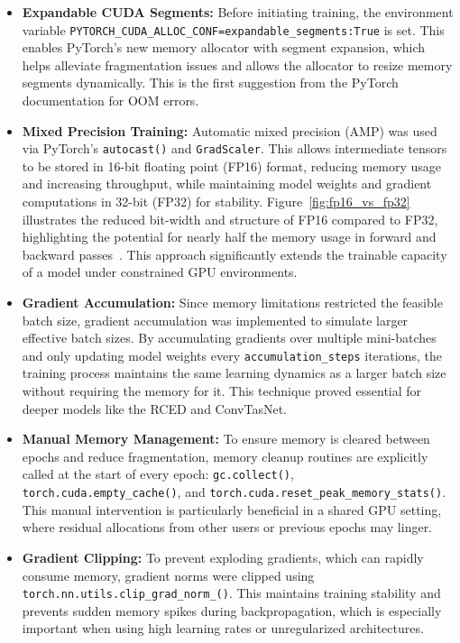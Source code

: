 \begin{itemize}
    \item \textbf{Expandable CUDA Segments:} Before initiating training, the environment variable \texttt{PYTORCH\_CUDA\_ALLOC\_CONF=expandable\_segments:True} is set. This enables PyTorch’s new memory allocator with segment expansion, which helps alleviate fragmentation issues and allows the allocator to resize memory segments dynamically. This is the first suggestion from the PyTorch documentation for OOM errors.

    \item \textbf{Mixed Precision Training:} Automatic mixed precision (AMP) was used via PyTorch’s \texttt{autocast()} and \texttt{GradScaler}. This allows intermediate tensors to be stored in 16-bit floating point (FP16) format, reducing memory usage and increasing throughput, while maintaining model weights and gradient computations in 32-bit (FP32) for stability. Figure~\ref{fig:fp16_vs_fp32} illustrates the reduced bit-width and structure of FP16 compared to FP32, highlighting the potential for nearly half the memory usage in forward and backward passes~\cite{mindspore_mixed_precision}. This approach significantly extends the trainable capacity of a model under constrained GPU environments.

    \item \textbf{Gradient Accumulation:} Since memory limitations restricted the feasible batch size, gradient accumulation was implemented to simulate larger effective batch sizes. By accumulating gradients over multiple mini-batches and only updating model weights every \texttt{accumulation\_steps} iterations, the training process maintains the same learning dynamics as a larger batch size without requiring the memory for it. This technique proved essential for deeper models like the RCED and ConvTasNet.

    \item \textbf{Manual Memory Management:} To ensure memory is cleared between epochs and reduce fragmentation, memory cleanup routines are explicitly called at the start of every epoch: \texttt{gc.collect()}, \texttt{torch.cuda.empty\_cache()}, and \texttt{torch.cuda.reset\_peak\_memory\_stats()}. This manual intervention is particularly beneficial in a shared GPU setting, where residual allocations from other users or previous epochs may linger.

    \item \textbf{Gradient Clipping:} To prevent exploding gradients, which can rapidly consume memory, gradient norms were clipped using \texttt{torch.nn.utils.clip\_grad\_norm\_()}. This maintains training stability and prevents sudden memory spikes during backpropagation, which is especially important when using high learning rates or unregularized architectures.


\end{itemize}
